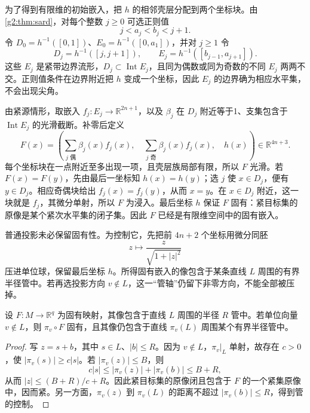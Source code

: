 为了得到有限维的初始嵌入，把 \(h\) 的相邻壳层分配到两个坐标块。由\cref{g2:thm:sard}，对每个整数 \(j\ge0\) 可选正则值
\[
	j<a_j<b_j<j+1.
\]
令 \(D_0=h^{-1}([0,1])\)、\(E_0=h^{-1}([0,a_1])\)，并对 \(j\ge1\) 令
\[
	D_j=h^{-1}([j,j+1]),\qquad E_j=h^{-1}([b_{j-1},a_{j+1}]).
\]
这些 \(E_j\) 是紧带边界流形，\(D_j\subset\operatorname{Int}E_j\)，且同为偶数或同为奇数的不同 \(E_j\) 两两不交。正则值条件在边界附近把 \(h\) 变成一个坐标，因此 \(E_j\) 的边界确为相应水平集，不会出现尖角。

\ProseParagraphBreak

由紧源情形，取嵌入 \(f_j:E_j\to\mathbb R^{2n+1}\)，以及 \(\beta_j\) 在 \(D_j\) 附近等于1、支集包含于 \(\operatorname{Int}E_j\) 的光滑截断。补零后定义
\[
	F(x)=\left(\sum_{j\text{ 偶}}\beta_j(x)f_j(x),\quad
	\sum_{j\text{ 奇}}\beta_j(x)f_j(x),\quad h(x)\right)
	\in\mathbb R^{4n+3}.
\]
每个坐标块在一点附近至多出现一项，且壳层族局部有限，所以 \(F\) 光滑。若 \(F(x)=F(y)\)，先由最后一坐标知 \(h(x)=h(y)\)；选 \(j\) 使 \(x\in D_j\)，便有 \(y\in D_j\)。相应奇偶块给出 \(f_j(x)=f_j(y)\)，从而 \(x=y\)。在 \(x\in D_j\) 附近，这一块就是 \(f_j\)，其微分单射，所以 \(F\) 为浸入。最后坐标 \(h\) 保证 \(F\) 固有：紧目标集的原像是某个紧次水平集的闭子集。因此 \(F\) 已经是有限维空间中的固有嵌入。

\ProseParagraphBreak

普通投影未必保留固有性。为控制它，先把前 \(4n+2\) 个坐标用微分同胚
\[
	z\longmapsto\frac{z}{\sqrt{1+|z|^2}}
\]
压进单位球，保留最后坐标 \(h\)。所得固有嵌入的像包含于某条直线 \(L\) 周围的有界半径管中。若再选投影方向 \(v\notin L\)，这一“管轴”仍留下非零方向，不能全部被压掉。

\begin{lemma}\label{g2:lem:proper-projection-tube}
	设 \(F:M\to\mathbb R^q\) 为固有映射，其像包含于直线 \(L\) 周围的半径 \(R\) 管中。若单位向量 \(v\notin L\)，则 \(\pi_v\circ F\) 固有，且其像仍包含于直线 \(\pi_v(L)\) 周围某个有界半径管中。
\end{lemma}
\begin{proof}
	写 \(z=s+b\)，其中 \(s\in L\)、\(|b|\le R\)。因为 \(v\notin L\)，\(\pi_v|_L\) 单射，故存在 \(c>0\)，使 \(|\pi_v(s)|\ge c|s|\)。若 \(|\pi_v(z)|\le B\)，则
	\[
		c|s|\le|\pi_v(z)|+|\pi_v(b)|\le B+R,
	\]
	从而 \(|z|\le(B+R)/c+R\)。因此紧目标集的原像闭且包含于 \(F\) 的一个紧集原像中，因而紧。另一方面，\(\pi_v(z)\) 到 \(\pi_v(L)\) 的距离不超过 \(|\pi_v(b)|\le R\)，得到管的控制。
\end{proof}

